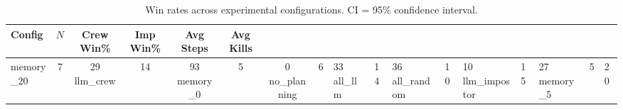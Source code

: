 \begin{table}[h]
\centering
\caption{Win rates across experimental configurations. CI = 95\% confidence interval.}
\label{tab:winrates}
\begin{tabular}{lcccccc}
\toprule
Config & $N$ & Crew Win\% & Imp Win\% & Avg Steps & Avg Kills \\
\midrule
memory\_20 & 7 & 29%
llm\_crew & 14 & 93%
memory\_0 & 5 & 0%
no\_planning & 6 & 33%
all\_llm & 14 & 36%
all\_random & 10 & 10%
llm\_impostor & 15 & 27%
memory\_5 & 5 & 20%
\bottomrule
\end{tabular}
\end{table}